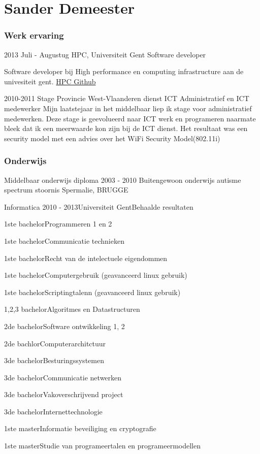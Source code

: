 \documentclass{tccv}
\begin{document}
\part{Sander Demeester}
\section{Werk ervaring}
\begin{eventlist}
\item{2013 Juli - Augustug}
{HPC, Universiteit Gent}
{Software developer}

Software developer bij High performance en computing infrastructure aan de univesiteit gent.
\href{https://github.com/hpcugent}{HPC Github}

\item{2010-2011}
{Stage Provincie West-Vlaanderen dienst ICT}
{Administratief en ICT medewerker}
Mijn laatstejaar in het middelbaar liep ik stage voor administratief medewerken. Deze stage is geevolueerd naar ICT werk en programeren naarmate bleek dat ik een meerwaarde kon zijn bij de ICT dienst. Het resultaat was een security model met een advies over het WiFi Security Model(802.11i)
\end{eventlist}
\section{Onderwijs}
\begin{yearlist}
\item[Middelbaar onderwijs diploma]{2003 - 2010}
	 {Buitengewoon onderwijs autisme spectrum stoornis}
	 {Spermalie, BRUGGE}
\item[Informatica]{2010 - 2013}{Universiteit Gent}{Behaalde resultaten}
	\end{yearlist} 
\begin{factlist}
\item{1ste bachelor}{Programmeren 1 en 2}
\item{1ste bachelor}{Communicatie technieken}
\item{1ste bachelor}{Recht van de intelectuele eigendommen}
\item{1ste bachelor}{Computergebruik (geavanceerd linux gebruik)}
\item{1ste bachelor}{Scriptingtalenn (geavanceerd linux gebruik)}
\item{1,2,3 bachelor}{Algoritmes en Datastructuren}
\item{2de bachelor}{Software ontwikkeling 1, 2}
\item{2de bachlor}{Computerarchitctuur}
\item{3de bachelor}{Besturingssystemen}
\item{3de bachelor}{Communicatie netwerken}
\item{3de bachelor}{Vakoverschrijvend project}
\item{3de bachelor}{Internettechnologie}
\item{1ste master}{Informatie beveiliging en cryptografie}
\item{1ste master}{Studie van programeertalen en programeermodellen}
\end{factlist}
\end{document}
